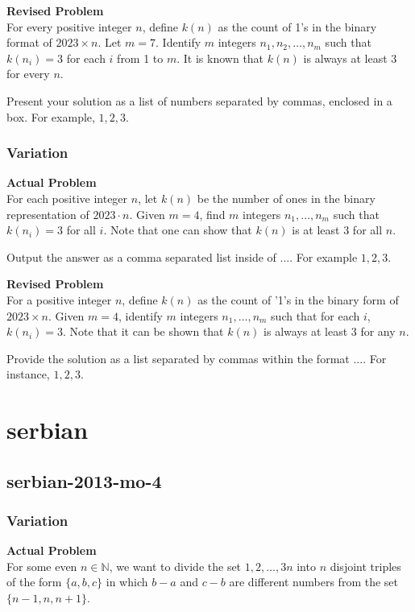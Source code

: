 \textbf{Revised Problem}\\
For every positive integer \( n \), define \( k(n) \) as the count of 1's in the binary format of \( 2023 \times n \). Let \( m = 7 \). Identify \( m \) integers \( n_1, n_2, \ldots, n_m \) such that \( k(n_i) = 3 \) for each \( i \) from 1 to \( m \).
It is known that \( k(n) \) is always at least 3 for every \( n \).

Present your solution as a list of numbers separated by commas, enclosed in a box. For example, \(\boxed{1, 2, 3}\).

\subsubsection{Variation}
\textbf{Actual Problem}\\
For each positive integer $n$, let $k(n)$ be the number of ones in the binary representation of $2023 \cdot n$. 
Given $m = 4$, find $m$ integers $n_1, \dots, n_m$ such that $k(n_i) = 3$ for all $i$.
Note that one can show that $k(n)$ is at least $3$ for all $n$.

Output the answer as a comma separated list inside of $\boxed{...}$. For example $\boxed{1, 2, 3}$.

\textbf{Revised Problem}\\
For a positive integer \( n \), define \( k(n) \) as the count of '1's in the binary form of \( 2023 \times n \). Given \( m = 4 \), identify \( m \) integers \( n_1, \ldots, n_m \) such that for each \( i \), \( k(n_i) = 3 \). Note that it can be shown that \( k(n) \) is always at least 3 for any \( n \).

Provide the solution as a list separated by commas within the format \(\boxed{...}\). For instance, \(\boxed{1, 2, 3}\).

\section{serbian}
\subsection{serbian-2013-mo-4}
\subsubsection{Variation}
\textbf{Actual Problem}\\
For some even $n \in \mathbb{N}$, we want to divide the set ${1, 2, \ldots, 3n}$ into $n$ disjoint triples of the form $\{a,b,c\}$ in which $b-a$ and $c-b$ are different numbers from the set $\{n-1,n,n+1\}$.

